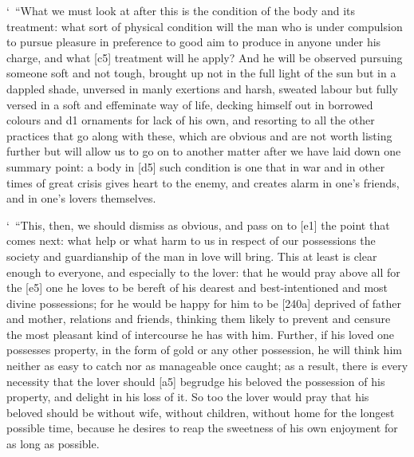 ‘~“What we must look at after this is the condition of the body and its
treatment: what sort of physical condition will the man who is under
compulsion to pursue pleasure in preference to good aim to produce in
anyone under his charge, and what {[}c5{]} treatment will he apply? And
he will be observed pursuing someone soft and not tough, brought up not
in the full light of the sun but in a dappled shade, unversed in manly
exertions and harsh, sweated labour but fully versed in a soft and
effeminate way of life, decking himself out in borrowed colours and d1
ornaments for lack of his own, and resorting to all the other practices
that go along with these, which are obvious and are not worth listing
further but will allow us to go on to another matter after we have laid
down one summary point: a body in {[}d5{]} such condition is one that in
war and in other times of great crisis gives heart to the enemy, and
creates alarm in one's friends, and in one's lovers themselves.

‘~“This, then, we should dismiss as obvious, and pass on to {[}e1{]} the
point that comes next: what help or what harm to us in respect of our
possessions the society and guardianship of the man in love will bring.
This at least is clear enough to everyone, and especially to the lover:
that he would pray above all for the {[}e5{]} one he loves to be bereft
of his dearest and best-intentioned and most divine possessions; for he
would be happy for him to be {[}240a{]} deprived of father and mother,
relations and friends, thinking them likely to prevent and censure the
most pleasant kind of intercourse he has with him. Further, if his loved
one possesses property, in the form of gold or any other possession, he
will think him neither as easy to catch nor as manageable once caught;
as a result, there is every necessity that the lover should {[}a5{]}
begrudge his beloved the possession of his property, and delight in his
loss of it. So too the lover would pray that his beloved should be
without wife, without children, without home for the longest possible
time, because he desires to reap the sweetness of his own enjoyment for
as long as possible.

